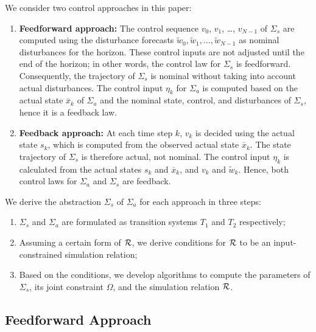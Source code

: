 We consider two control approaches in this paper:
\begin{enumerate}
\item \textbf{Feedforward approach:} The control sequence $v_{0}$, $v_{1}$, \dots, $v_{N-1}$ of $\Sigma_{s}$ are computed using the disturbance forecasts $\tilde{w}_{0}, \tilde{w}_{1}, \dots, \tilde{w}_{N-1}$ as nominal disturbances for the horizon.  These control inputs are not adjusted until the end of the horizon; in other words, the control law for $\Sigma_{s}$ is feedforward.  Consequently, the trajectory of $\Sigma_{s}$ is nominal without taking into account actual disturbances.  The control input $\eta_{k}$ for $\Sigma_{a}$ is computed based on the actual state $\overbar{x}_{k}$ of $\Sigma_{a}$ and the nominal state, control, and disturbances of $\Sigma_{s}$, hence it is a feedback law.
\item \textbf{Feedback approach:} At each time step $k$, $v_{k}$ is decided using the actual state $s_{k}$, which is computed from the observed actual state $\overbar{x}_{k}$. %
  The state trajectory of $\Sigma_{s}$ is therefore actual, not nominal.  The control input $\eta_{k}$ is calculated from the actual states $s_{k}$ and $\overbar{x}_{k}$, and $v_{k}$ and $\tilde{w}_{k}$.  Hence, both control laws for $\Sigma_{a}$ and $\Sigma_{s}$ are feedback.
\end{enumerate}

We derive the abstraction $\Sigma_{s}$ of $\Sigma_{a}$ for each approach in three steps:
\begin{enumerate}
\item $\Sigma_{s}$ and $\Sigma_{a}$ are formulated as transition systems $T_{1}$ and $T_{2}$ respectively;
\item Assuming a certain form of $\mathcal{R}$, we derive %
  conditions for $\mathcal{R}$ to be an input-constrained simulation relation;
\item Based on the conditions, we develop algorithms to compute the parameters of $\Sigma_{s}$, its joint constraint $\Omega$, and the simulation relation $\mathcal{R}$.
\end{enumerate}
%


\subsection{Feedforward Approach}
\label{sec:abstraction-gs:feedforward}

